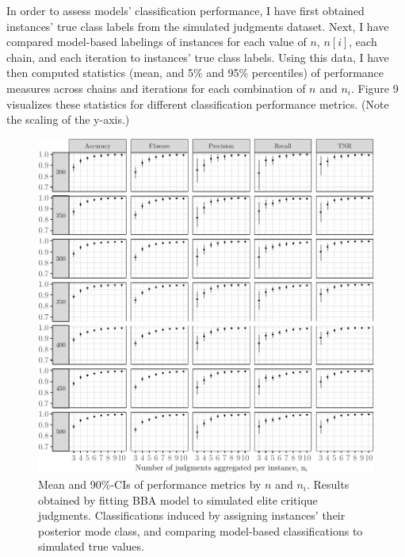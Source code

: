 \documentclass[12pt,]{article}
\begin{document}
In order to assess models' classification performance, I have first
obtained instances' true class labels from the simulated judgments
dataset. Next, I have compared model-based labelings of instances for
each value of \(n\), \(n[i]\), each chain, and each iteration to
instances' true class labels. Using this data, I have then computed
statistics (mean, and 5\% and 95\% percentiles) of performance measures
across chains and iterations for each combination of \(n\) and \(n_i\).
Figure 9 visualizes these statistics for different classification
performance metrics. (Note the scaling of the y-axis.)

\begin{figure}[H]

{\centering \includegraphics{licht_2019_evaluating_crowdsourced_elite_critique_codings_files/figure-latex/sim_post_classification_performance-1} 

}

\caption{Mean and 90\%-CIs of performance metrics by $n$ and $n_i$. Results obtained by fitting BBA model to simulated elite critique judgments. Classifications induced by assigning instances' their posterior mode class, and comparing model-based classifications to simulated true values.}\label{fig:sim_post_classification_performance}
\end{figure}
\end{document}
